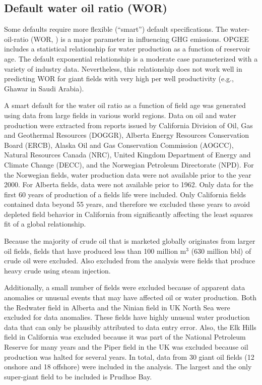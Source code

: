 \documentclass[11pt]{report}
\newcommand{\xlname}[1]{\raisebox{1pt}{\fcolorbox{light-gray}{light-gray}{\texttt{\textcolor{stanford}{\scriptsize{#1}}}}}}
\begin{document}
\subsection{Default water oil ratio (WOR)} \label{WORSmartDefault}

Some defaults require more flexible (``smart'') default specifications. The water-oil-ratio (WOR, \xlname{WOR}) is a major parameter in influencing GHG emissions. OPGEE includes a statistical relationship for water production as a function of reservoir age. The default exponential relationship is a moderate case parameterized with a variety of industry data. Nevertheless, this relationship does not work well in predicting WOR for giant fields with very high per well productivity (e.g., Ghawar in Saudi Arabia).

A smart default for the water oil ratio as a function of field age was generated using data from large fields in various world regions. Data on oil and water production were extracted from reports issued by California Division of Oil, Gas and Geothermal Resources (DOGGR), Alberta Energy Resources Conservation Board (ERCB), Alaska Oil and Gas Conservation Commission (AOGCC), Natural Resources Canada (NRC), United Kingdom Department of Energy and Climate Change (DECC), and the Norwegian Petroleum Directorate (NPD). For the Norwegian fields, water production data were not available prior to the year 2000. For Alberta fields, data were not available prior to 1962. Only data for the first 60 years of production of a fields life were included. Only California fields contained data beyond 55 years, and therefore we excluded these years to avoid depleted field behavior in California from significantly affecting the least squares fit of a global relationship. 

Because the majority of crude oil that is marketed globally originates from larger oil fields, fields that have produced less than 100 million m$^3$ (630 million bbl) of crude oil were excluded. Also excluded from the analysis were fields that produce heavy crude using steam injection. 

Additionally, a small number of fields were excluded because of apparent data anomalies or unusual events that may have affected oil or water production. Both the Redwater field in Alberta and the Ninian field in UK North Sea were excluded for data anomalies. These fields have highly unusual water production data that can only be plausibly attributed to data entry error. Also, the Elk Hills field in California was excluded because it was part of the National Petroleum Reserve for many years and the Piper field in the UK was excluded because oil production was halted for several years. In total, data from 30 giant oil fields (12 onshore and 18 offshore) were included in the analysis. The largest and the only super-giant field to be included is Prudhoe Bay.
\end{document}

